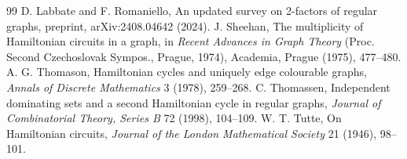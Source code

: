 \documentclass[11pt,a4paper]{article}
\theoremstyle{definition}
\theoremstyle{remark}
\begin{document}
\begin{thebibliography}{99}
 D. Labbate and F. Romaniello, An updated survey on 2-factors of regular graphs, preprint, arXiv:2408.04642 (2024).
 J. Sheehan, The multiplicity of Hamiltonian circuits in a graph, in \emph{Recent Advances in Graph Theory} (Proc. Second Czechoslovak Sympos., Prague, 1974), Academia, Prague (1975), 477--480.
 A. G. Thomason, Hamiltonian cycles and uniquely edge colourable graphs, \emph{Annals of Discrete Mathematics} 3 (1978), 259--268.
 C. Thomassen, Independent dominating sets and a second Hamiltonian cycle in regular graphs, \emph{Journal of Combinatorial Theory, Series B} 72 (1998), 104--109.
 W. T. Tutte, On Hamiltonian circuits, \emph{Journal of the London Mathematical Society} 21 (1946), 98--101.
\end{thebibliography}
\end{document}
